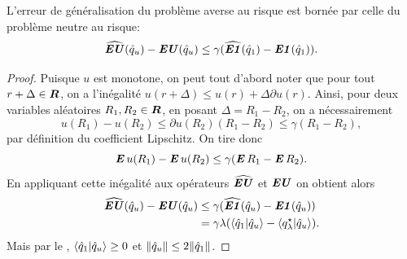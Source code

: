 \begin{lemme}
L'erreur de généralisation du problème averse au risque est bornée par celle du problème
neutre au risque:
\begin{equation}
  \hEU(\qu) - \EU(\qu) \leq \gamma(\hEN(\qn) - \EN(\qn)).
\end{equation}
\end{lemme}
\begin{proof}
  Puisque $u$ est monotone, on peut tout d'abord noter que pour tout $r+\Delta \in \R$, on a
  l'inégalité $u(r+\Delta) \leq u(r) + \Delta \partial u(r)$. Ainsi, pour deux variables aléatoires $R_1,R_2 \in
  \R$, en posant $\Delta = R_1-R_2$, on a nécessairement
  \begin{equation}
    u(R_1) - u(R_2) \leq \partial u(R_2) (R_1 -R_2) \leq \gamma(R_1 - R_2),
  \end{equation}
  par définition du coefficient Lipschitz. On tire donc
  \begin{equation}
    \E u(R_1) - \E u(R_2) \leq \gamma(\E R_1 - \E R_2). 
  \end{equation}
  En appliquant cette inégalité aux opérateurs $\hEU$ et $\EU$ on obtient alors
  \begin{align}
    \hEU(\qu) - \EU(\qu) &\leq \gamma(\hEN(\qu) - \EN(\qu))\\
                         &= \gamma\lambda(\braket{\qh_1|\qu} - \braket{\qsl|\qu}).
  \end{align}
  Mais par le , $\braket{\qh_1|\qu} \geq 0$ et $\|\qu\| \leq 2\|\qh_1\|$. 
\end{proof}







